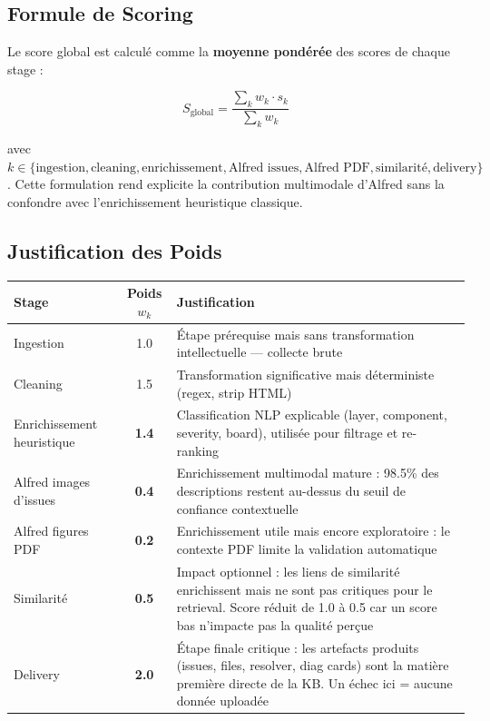 \documentclass[12pt,a4paper]{report}
\begin{document}
\subsection{Formule de Scoring}

Le score global est calculé comme la \textbf{moyenne pondérée} des scores de chaque stage :

\begin{equation}
\boxed{
S_{\text{global}} = \frac{\sum_k w_k \cdot s_k}{\sum_k w_k}
}
\label{eq:score_global_v2}
\end{equation}

avec $k \in \{\text{ingestion}, \text{cleaning}, \text{enrichissement}, \text{Alfred issues}, \text{Alfred PDF}, \text{similarité}, \text{delivery}\}$. Cette formulation rend explicite la contribution multimodale d'Alfred sans la confondre avec l'enrichissement heuristique classique.

\subsection{Justification des Poids}

\begin{longtable}{lcp{8cm}}
\toprule
\textbf{Stage} & \textbf{Poids $w_k$} & \textbf{Justification} \\
\midrule
Ingestion & 1.0 & Étape prérequise mais sans transformation intellectuelle --- collecte brute \\
Cleaning & 1.5 & Transformation significative mais déterministe (regex, strip HTML) \\
Enrichissement heuristique & \textbf{1.4} & Classification NLP explicable (layer, component, severity, board), utilisée pour filtrage et re-ranking \\
Alfred images d'issues & \textbf{0.4} & Enrichissement multimodal mature : 98.5\% des descriptions restent au-dessus du seuil de confiance contextuelle \\
Alfred figures PDF & \textbf{0.2} & Enrichissement utile mais encore exploratoire : le contexte PDF limite la validation automatique \\
Similarité & \textbf{0.5} & Impact optionnel : les liens de similarité enrichissent mais ne sont pas critiques pour le retrieval. Score réduit de 1.0 à 0.5 car un score bas n'impacte pas la qualité perçue \\
Delivery & \textbf{2.0} & Étape finale critique : les artefacts produits (issues, files, resolver, diag cards) sont la matière première directe de la KB. Un échec ici = aucune donnée uploadée \\
\bottomrule
\end{longtable}
\end{document}
